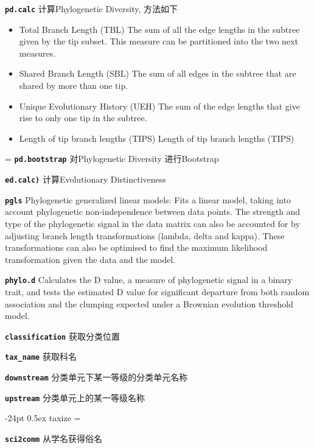 \documentclass[10pt,landscape]{article}
\makeatletter
\renewcommand\section{\@startsection{section}{1}{0mm}%
                                     {-24pt}%
                                     {0.5ex}%
                                {\color{blue}\normalfont\large\bfseries}}
\newcommand{\bcode}[1]{\texttt{\textbf{#1}}}
\makeatother
\begin{document}
\begin{CJK}{UTF8}{gbsn}
\begin{multicols}{3}
\bcode{pd.calc} 计算Phylogenetic Diversity, 方法如下

\begin{itemize}
\item Total Branch Length (TBL) The sum of all the edge lengths in the subtree given by the tip subset. This measure can be partitioned into the two next measures.

\item Shared Branch Length (SBL) The sum of all edges in the subtree that are shared by more than one tip.

\item Unique Evolutionary History (UEH) The sum of the edge lengths that give rise to only one tip in the subtree.

\item Length of tip branch lengths (TIPS) Length of tip branch lengths (TIPS)
\end{itemize}

\everypar={\hangindent=9mm}
\bcode{pd.bootstrap} 对Phylogenetic Diversity 进行Bootstrap

\bcode{ed.calc)}  计算Evolutionary Distinctiveness

\bcode{pgls} Phylogenetic generalized linear models: Fits a linear model, taking into account phylogenetic non-independence between data points. The strength and type of the phylogenetic signal in the data matrix can also be accounted for by adjusting branch length transformations (lambda, delta and kappa). These transformations can also be optimised to find the maximum likelihood transformation given the data and the model.

\bcode{phylo.d} Calculates the D value, a measure of phylogenetic signal in a binary trait, and tests the estimated D value for significant departure from both random association and the clumping expected under a Brownian evolution threshold model.

\bcode{classification} 获取分类位置

\bcode{tax\_name} 获取科名

\bcode{downstream} 分类单元下某一等级的分类单元名称

\bcode{upstream} 分类单元上的某一等级名称

\section{taxize}
\everypar={\hangindent=9mm}

\bcode{sci2comm} 从学名获得俗名


\end{multicols}
\end{CJK}
\end{document}
